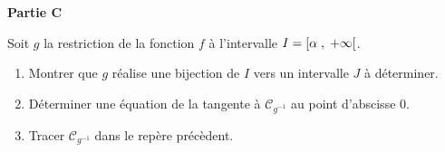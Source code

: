 \textbf{Partie C}

Soit $ g $  la restriction de la fonction  $ f $ à l'intervalle $ I=\left[\alpha \;,\; +\infty\right[$.
\begin{enumerate}
\item Montrer que $ g $  réalise une bijection de $ I $ vers un intervalle $ J $ à déterminer.
\item Déterminer une équation de la tangente à $\mathscr{C}_{g^{-1}}$ au point d'abscisse $ 0 $.
\item Tracer $\mathscr{C}_{g^{-1}}$  dans le repère précèdent.
\end{enumerate}









